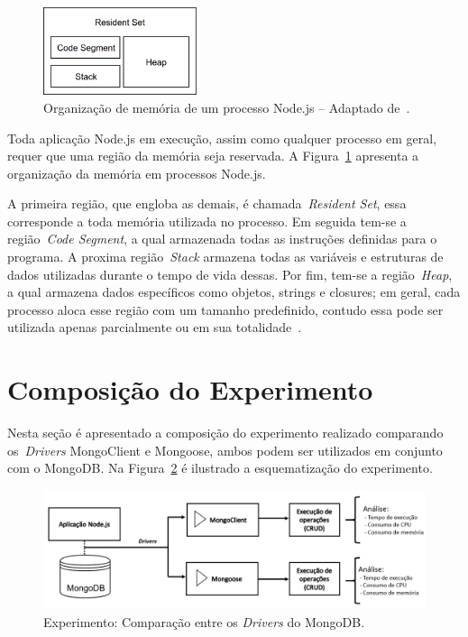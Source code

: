 \documentclass[12pt]{article}
\begin{document}
\begin{figure}[!h]
    \centering
    \includegraphics[width=0.4\textwidth]{images/set}
    \caption{Organização de memória de um processo Node.js -- Adaptado de~\cite{nodememory}.} %
    \label{figure:memoria}
\end{figure}

Toda aplicação Node.js em execução, assim como qualquer processo em geral, requer que uma região da memória seja reservada. A Figura~\ref{figure:memoria} apresenta a organização da memória em processos Node.js.

A primeira região, que engloba as demais, é chamada~\emph{Resident Set}, essa corresponde a toda memória utilizada no processo.  Em seguida tem-se a região~\emph{Code Segment}, a qual armazenada todas as instruções definidas para o programa.
A proxima região~\emph{Stack} armazena todas as variáveis e estruturas de dados utilizadas durante o tempo de vida dessas. Por fim, tem-se a região~\emph{Heap}, a qual armazena dados específicos como objetos, strings e closures; em geral, cada processo aloca esse região com um tamanho predefinido, contudo essa pode ser utilizada apenas parcialmente ou em sua totalidade~\cite{nodememory}. 

\section{Composição do Experimento}
\label{section:experimento}

Nesta seção é apresentado a composição do experimento realizado comparando os~\emph{Drivers} MongoClient e Mongoose, ambos podem ser utilizados em conjunto com o MongoDB. Na Figura~\ref{figure:diagrama-banco} é ilustrado a esquematização do experimento. 

\begin{figure}[ht]
    \centering
    \includegraphics[width=\textwidth]{images/esquema-experimento.png}
    \caption{Experimento: Comparação entre os \emph{Drivers} do MongoDB.}
    \label{figure:diagrama-banco}
\end{figure}
\end{document}
